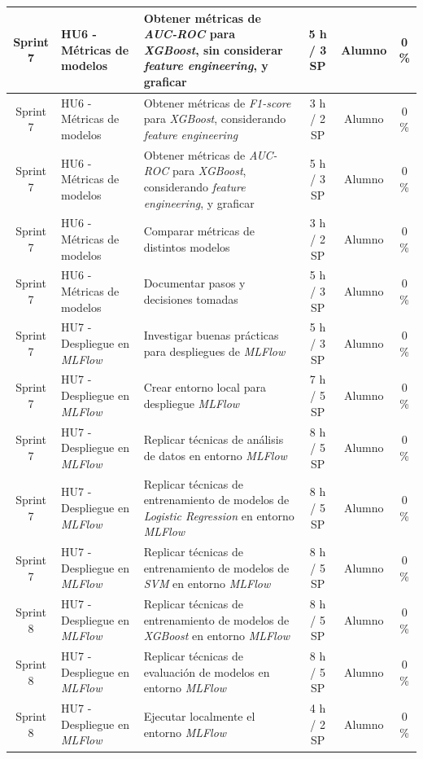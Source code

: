 \documentclass[
11pt, %
]{charter}
\begin{document}
\begin{xltabular}{\linewidth}{@{}|c|X|X|c|c|c|@{}}
Sprint 7 & HU6 - Métricas de modelos & Obtener métricas de \textit{AUC-ROC} para \textit{XGBoost}, sin  considerar \textit{feature engineering}, y graficar  & 5 h / 3 SP & Alumno & 0 \%\\ \hline
Sprint 7 & HU6 - Métricas de modelos & Obtener métricas de \textit{F1-score} para \textit{XGBoost}, considerando \textit{feature engineering}  & 3 h / 2 SP & Alumno & 0 \%\\ \hline
Sprint 7 & HU6 - Métricas de modelos & Obtener métricas de \textit{AUC-ROC} para \textit{XGBoost}, considerando \textit{feature engineering}, y graficar  & 5 h / 3 SP & Alumno & 0 \%\\ \hline
Sprint 7 & HU6 - Métricas de modelos & Comparar métricas de distintos modelos  & 3 h / 2 SP & Alumno & 0 \%\\ \hline
Sprint 7 & HU6 - Métricas de modelos & Documentar pasos y decisiones tomadas & 5 h / 3 SP & Alumno & 0 \%\\ \hline
Sprint 7 & HU7 - Despliegue en \textit{MLFlow}  & Investigar buenas prácticas para despliegues de \textit{MLFlow}  & 5 h / 3 SP & Alumno & 0 \%\\ \hline
Sprint 7 & HU7 - Despliegue en \textit{MLFlow}  & Crear entorno local para despliegue \textit{MLFlow}  & 7 h / 5 SP & Alumno & 0 \%\\ \hline
Sprint 7 & HU7 - Despliegue en \textit{MLFlow}  & Replicar técnicas de análisis de datos en entorno \textit{MLFlow}  & 8 h / 5 SP & Alumno & 0 \%\\ \hline
Sprint 7 & HU7 - Despliegue en \textit{MLFlow}  & Replicar técnicas de entrenamiento de modelos de \textit{Logistic Regression} en entorno \textit{MLFlow}  & 8 h / 5 SP & Alumno & 0 \%\\ \hline
Sprint 7 & HU7 - Despliegue en \textit{MLFlow}  & Replicar técnicas de entrenamiento de modelos de \textit{SVM} en entorno \textit{MLFlow}  & 8 h / 5 SP & Alumno & 0 \%\\ \hline
Sprint 8 & HU7 - Despliegue en \textit{MLFlow}  & Replicar técnicas de entrenamiento de modelos de \textit{XGBoost} en entorno \textit{MLFlow}  & 8 h / 5 SP & Alumno & 0 \%\\ \hline
Sprint 8 & HU7 - Despliegue en \textit{MLFlow}  & Replicar técnicas de evaluación de modelos en entorno \textit{MLFlow}  & 8 h / 5 SP & Alumno & 0 \%\\ \hline
Sprint 8 & HU7 - Despliegue en \textit{MLFlow}  & Ejecutar localmente el entorno \textit{MLFlow}  & 4 h / 2 SP & Alumno & 0 \% \\ \hline

\end{xltabular}
\end{document}

